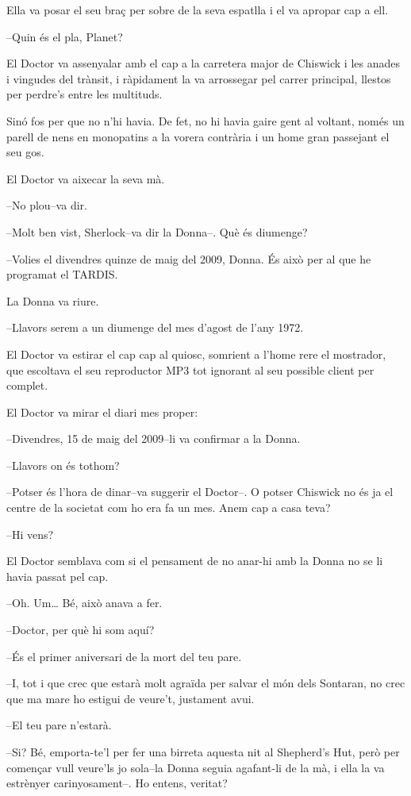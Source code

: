 Ella va posar el seu braç per sobre de la seva espatlla i el va apropar
cap a ell.

--Quin és el pla, Planet?

El Doctor va assenyalar amb el cap a la carretera major de Chiswick i
les anades i vingudes del trànsit, i ràpidament la va arrossegar pel
carrer principal, llestos per perdre's entre les multituds.

Sinó fos per que no n'hi havia. De fet, no hi havia gaire gent al
voltant, només un parell de nens en monopatins a la vorera contrària i
un home gran passejant el seu gos.

El Doctor va aixecar la seva mà.

--No plou--va dir.

--Molt ben vist, Sherlock--va dir la Donna--. Què és diumenge?

--Volies el divendres quinze de maig del 2009, Donna. És això per al que
he programat el TARDIS.

La Donna va riure.

--Llavors serem a un diumenge del mes d'agost de l'any 1972.

El Doctor va estirar el cap cap al quiosc, somrient a l'home rere el
mostrador, que escoltava el seu reproductor MP3 tot ignorant al seu
possible client per complet.

El Doctor va mirar el diari mes proper:

--Divendres, 15 de maig del 2009--li va confirmar a la Donna.

--Llavors on és tothom?

--Potser és l'hora de dinar--va suggerir el Doctor--. O potser Chiswick
no és ja el centre de la societat com ho era fa un mes. Anem cap a casa
teva?

--Hi vens?

El Doctor semblava com si el pensament de no anar-hi amb la Donna no se
li havia passat pel cap.

--Oh. Um\ldots{} Bé, això anava a fer.

--Doctor, per què hi som aquí?

--És el primer aniversari de la mort del teu pare.

--I, tot i que crec que estarà molt agraïda per salvar el món dels
Sontaran, no crec que ma mare ho estigui de veure't, justament avui.

--El teu pare n'estarà.

--Si? Bé, emporta-te'l per fer una birreta aquesta nit al Shepherd's
Hut, però per començar vull veure'ls jo sola--la Donna seguia agafant-li
de la mà, i ella la va estrènyer carinyosament--. Ho entens, veritat?

